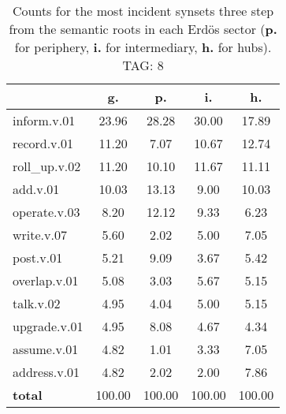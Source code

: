 \begin{table}[h!]
\begin{center}
\begin{tabular}{| l | c | c | c | c |}\hline
 & g. & p. & i. & h. \\\hline
inform.v.01 & 23.96  & 28.28  & 30.00  & 17.89 \\\hline
record.v.01 & 11.20  & 7.07  & 10.67  & 12.74 \\\hline
roll\_up.v.02 & 11.20  & 10.10  & 11.67  & 11.11 \\\hline
add.v.01 & 10.03  & 13.13  & 9.00  & 10.03 \\\hline
operate.v.03 & 8.20  & 12.12  & 9.33  & 6.23 \\\hline
write.v.07 & 5.60  & 2.02  & 5.00  & 7.05 \\\hline
post.v.01 & 5.21  & 9.09  & 3.67  & 5.42 \\\hline
overlap.v.01 & 5.08  & 3.03  & 5.67  & 5.15 \\\hline
talk.v.02 & 4.95  & 4.04  & 5.00  & 5.15 \\\hline
upgrade.v.01 & 4.95  & 8.08  & 4.67  & 4.34 \\\hline
assume.v.01 & 4.82  & 1.01  & 3.33  & 7.05 \\\hline
address.v.01 & 4.82  & 2.02  & 2.00  & 7.86 \\\hline
{{\bf total}} & 100.00  & 100.00  & 100.00  & 100.00 \\\hline
\end{tabular}
\caption{Counts for the most incident synsets three step from the semantic roots in each Erd\"os sector ({\bf p.} for periphery, {\bf i.} for intermediary, {\bf h.} for hubs). TAG: 8}
\end{center}
\end{table}